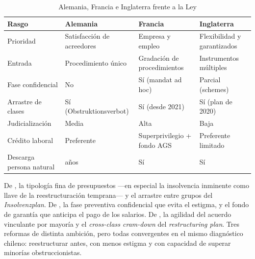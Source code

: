 \begin{table}[htbp]
\centering
\footnotesize
\caption{Alemania, Francia e Inglaterra frente a la Ley }
\label{tab:cap28-europa}
\begin{tabularx}{\textwidth}{@{}>{\raggedright\arraybackslash}p{}
                                 >{\raggedright\arraybackslash}p{}
                                 >{\raggedright\arraybackslash}p{} X@{}}
\toprule
\textbf{Rasgo} & \textbf{Alemania} & \textbf{Francia} & \textbf{Inglaterra} \\
\midrule
Prioridad & Satisfacción de acreedores & Empresa y empleo & Flexibilidad y garantizados \\
\addlinespace
Entrada & Procedimiento único & Gradación de procedimientos & Instrumentos múltiples \\
\addlinespace
Fase confidencial & No & Sí (mandat ad hoc) & Parcial (schemes) \\
\addlinespace
Arrastre de clases & Sí (Obstruktionsverbot) & Sí (desde 2021) & Sí (plan de 2020) \\
\addlinespace
Judicialización & Media & Alta & Baja \\
\addlinespace
Crédito laboral & Preferente & Superprivilegio + fondo AGS & Preferente limitado \\
\addlinespace
Descarga persona natural & 3 años & Sí & Sí \\
\bottomrule
\end{tabularx}
\end{table}

\begin{foco}
De , la tipología fina de presupuestos ---en especial la insolvencia inminente
como llave de la reestructuración temprana--- y el arrastre entre grupos del \emph{Insolvenzplan}.
De , la fase preventiva confidencial que evita el estigma, y el fondo de garantía
que anticipa el pago de los salarios. De , la agilidad del acuerdo vinculante
por mayoría y el \emph{cross-class cram-down} del \emph{restructuring plan}. Tres reformas de
distinta ambición, pero todas convergentes en el mismo diagnóstico chileno: reestructurar antes,
con menos estigma y con capacidad de superar minorías obstruccionistas.
\end{foco}
